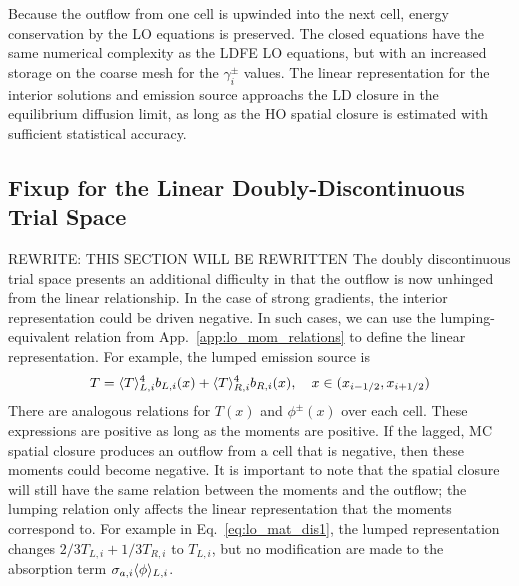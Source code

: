 Because the
outflow from one cell is upwinded into the next cell, energy conservation by the LO
equations is preserved.
The closed equations have the
same numerical complexity as the LDFE LO equations, but with an increased storage on the
coarse mesh for the
$\gamma_i^{\pm}$ values.  The linear representation for the interior
solutions and emission source approachs the LD closure in the equilibrium diffusion limit, as long
as the HO spatial closure is estimated with sufficient statistical accuracy.  


\subsection{Fixup for the Linear Doubly-Discontinuous Trial Space}

REWRITE: THIS SECTION WILL BE REWRITTEN
The doubly discontinuous trial space presents an additional difficulty in that the outflow
is now unhinged from the linear relationship. 
In the case of strong gradients, the interior representation could be driven
negative.  In such cases, we can use the lumping-equivalent relation from
App.~\ref{app:lo_mom_relations} to define the linear representation.  For
example, the lumped emission source is
\begin{equation}
    T = \langle T \rangle_{L,i}^4 b_{L,i}(x) + \langle T \rangle_{R,i}^4 b_{R,i}(x) , \quad x\in({x_{i-1/2}},{x_{i+1/2}})
\end{equation}
There are analogous relations for $T(x)$ and $\phi^\pm(x)$ over each cell.
These expressions are positive as long as the moments are positive.  If the lagged, MC spatial closure produces an outflow from a cell that is
negative, then these moments could become negative. 
It is important to note that the spatial closure will still have the same
relation between the moments and the outflow; the lumping relation only affects the
linear representation that the moments correspond to.  For example in
Eq.~\eqref{eq:lo_mat_dis1}, the lumped representation changes $2/3
T_{L,i} + 1/3 T_{R,i}$ to $T_{L,i}$, but no modification are made to the
absorption term $\sigma_{a,i}\langle \phi \rangle_{L,i}$.

